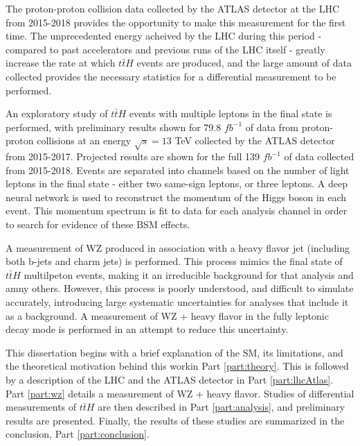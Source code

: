 The proton-proton collision data collected by the ATLAS detector at the LHC from 2015-2018 provides the opportunity to make this measurement for the first time. The unprecedented energy acheived by the LHC during this period - compared to past accelerators and previous runs of the LHC itself - greatly increase the rate at which $t\bar{t}H$ events are produced, and the large amount of data collected provides the necessary statistics for a differential measurement to be performed.

An exploratory study of $t\bar{t}H$ events with multiple leptons in the final state is performed, with preliminary results shown for 79.8 $fb^{-1}$ of data from proton-proton collisions at an energy $\sqrt{s} = 13$ TeV collected by the ATLAS detector from 2015-2017. Projected results are shown for the full 139 $fb^{-1}$ of data collected from 2015-2018. Events are separated into channels based on the number of light leptons in the final state - either two same-sign leptons, or three leptons. A deep neural network is used to reconstruct the momentum of the Higgs boson in each event. This momentum spectrum is fit to data for each analysis channel in order to search for evidence of these BSM effects.

A measurement of WZ produced in association with a heavy flavor jet (including both b-jets and charm jets) is performed. This process mimics the final state of $t\bar{t}H$ multilpeton events, making it an irreducible background for that analysis and amny others. However, this process is poorly understood, and difficult to simulate accurately, introducing large systematic uncertainties for analyses that include it as a background. A measurement of WZ + heavy flavor in the fully leptonic decay mode is performed in an attempt to reduce this uncertainty.

This dissertation begins with a brief explanation of the SM, its limitations, and the theoretical motivation behind this workin Part \ref{part:theory}. This is followed by a description of the LHC and the ATLAS detector in Part \ref{part:lhcAtlas}. Part \ref{part:wz} details a measurement of WZ + heavy flavor. Studies of differential measurements of $t\bar{t}H$ are then described in Part \ref{part:analysis}, and preliminary results are presented. Finally, the results of these studies are summarized in the conclusion, Part \ref{part:conclusion}.

